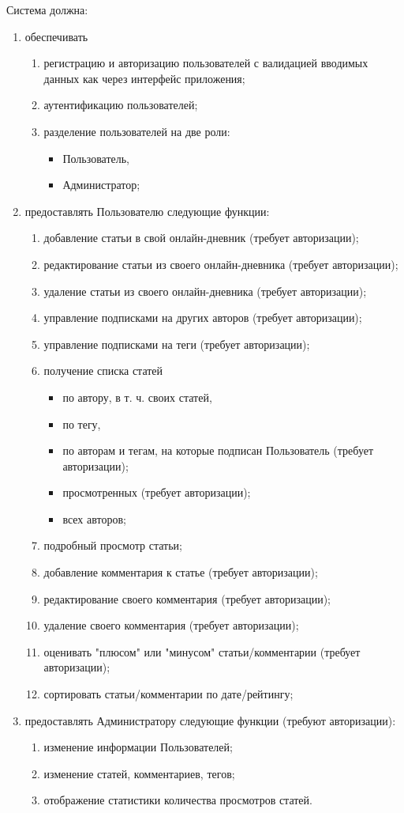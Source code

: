 \documentclass{bmstu-gost-7-32}
\begin{document}
Система должна:
\begin{enumerate}
	\item обеспечивать
	\begin{enumerate}
		\item регистрацию и авторизацию пользователей с валидацией вводимых данных как через интерфейс приложения;
		\item аутентификацию пользователей;
		\item разделение пользователей на две роли:
		\begin{itemize}
			\item Пользователь,
			\item Администратор;
		\end{itemize}
	\end{enumerate}
	\item предоставлять Пользователю следующие функции:
	\begin{enumerate}
		\item добавление статьи в свой онлайн-дневник (требует авторизации);
		\item редактирование статьи из своего онлайн-дневника (требует авторизации);
		\item удаление статьи из своего онлайн-дневника (требует авторизации);
		\item управление подписками на других авторов (требует авторизации);
		\item управление подписками на теги (требует авторизации);
		\item получение списка статей
		\begin{itemize}
			\item по автору, в т. ч. своих статей,
			\item по тегу,
			\item по авторам и тегам, на которые подписан Пользователь (требует авторизации);
			\item просмотренных (требует авторизации);
			\item всех авторов;
		\end{itemize}
		\item подробный просмотр статьи;
		\item добавление комментария к статье (требует авторизации);
		\item редактирование своего комментария (требует авторизации);
		\item удаление своего комментария (требует авторизации);
		\item оценивать "плюсом" или "минусом" статьи/комментарии (требует авторизации);
		\item сортировать статьи/комментарии по дате/рейтингу;
	\end{enumerate}
	\item предоставлять Администратору следующие функции (требуют авторизации):
	\begin{enumerate}
		\item изменение информации Пользователей;
		\item изменение статей, комментариев, тегов;
		\item отображение статистики количества просмотров статей.
	\end{enumerate}
\end{enumerate}
\end{document}
